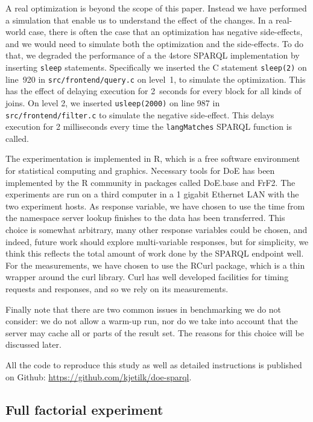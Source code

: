 \documentclass{llncs}
\begin{document}
A real optimization is beyond the scope of this paper. Instead we have
performed a simulation that enable us to understand the effect of the
changes.  
In a real-world case, there is often the case that an
optimization has negative side-effects, and we would need to simulate
both the optimization and the side-effects. To do that, we degraded
the performance of a the 4store SPARQL implementation by inserting
\texttt{sleep} statements. Specifically we inserted the C statement
\texttt{sleep(2)} on line~920 in \texttt{src/frontend/query.c} on
level~1, to simulate the optimization. This has the effect of delaying
execution for 2~seconds for every block for all kinds of joins. On
level 2, we inserted \texttt{usleep(2000)} on line 987 in
\texttt{src/frontend/filter.c} to simulate the negative
side-effect. This delays execution for 2 milliseconds every time the
\texttt{langMatches} SPARQL function is called.

The experimentation is implemented in R\cite{rmanual}, which is a free
software environment for statistical computing and graphics. Necessary
tools for DoE has been implemented by the R community in packages
called DoE.base\cite{doebase} and FrF2\cite{frf2}. The experiments are run on a third
computer in a 1 gigabit Ethernet LAN with the two experiment hosts.  As
response variable, we have chosen to use the time from the namespace
server lookup finishes to the data has been transferred. This choice is
somewhat arbitrary, many other response variables could be chosen, and
indeed, future work should explore multi-variable responses, but for
simplicity, we think this reflects the total amount of work done by
the SPARQL endpoint well. For the measurements, we have chosen to use
the RCurl package\cite{lang2007r}, which is a thin wrapper around the curl
library. Curl has well developed facilities for timing requests and
responses, and so we rely on its measurements.

Finally note that there are two common issues in benchmarking we do
not consider: we do not allow a warm-up run, nor do we take into
account that the server may cache all or parts of the result set. The
reasons for this choice will be discussed later.

All the code to reproduce this study as well as detailed instructions
is published on Github: \url{https://github.com/kjetilk/doe-sparql}.

\subsection{Full factorial experiment}\label{sec:full}
\end{document}
